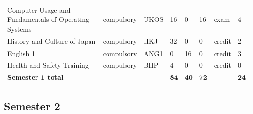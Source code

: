 \documentclass[12pt,a4paper]{article}
\begin{document}
{\begin{longtable}{m{5.0cm}m{1.9cm}m{0.75cm}m{0.85cm}m{0.85cm}m{0.85cm}m{1.45cm}m{0.9cm}}
\rowcolor{tableRowLight} Computer Usage and Fundamentals of Operating Systems & {\scriptsize compulsory} & UKOS & 16 & 0 & 16 & {\scriptsize exam} & 4 \\
\rowcolor{tableRowAlt} History and Culture of Japan & {\scriptsize compulsory} & HKJ & 32 & 0 & 0 & {\scriptsize credit} & 2 \\
\rowcolor{tableRowLight} English 1 & {\scriptsize compulsory} & ANG1 & 0 & 16 & 0 & {\scriptsize credit} & 3 \\
\rowcolor{tableRowAlt} Health and Safety Training & {\scriptsize compulsory} & BHP & 4 & 0 & 0 & {\scriptsize credit} & 0 \\
\midrule[\heavyrulewidth]
\rowcolor{tableSummary} \textbf{Semester 1 total} & & & \textbf{84} & \textbf{40} & \textbf{72} & & \textbf{24} \\
\bottomrule
\end{longtable}}

\subsection*{Semester 2}
\end{document}
